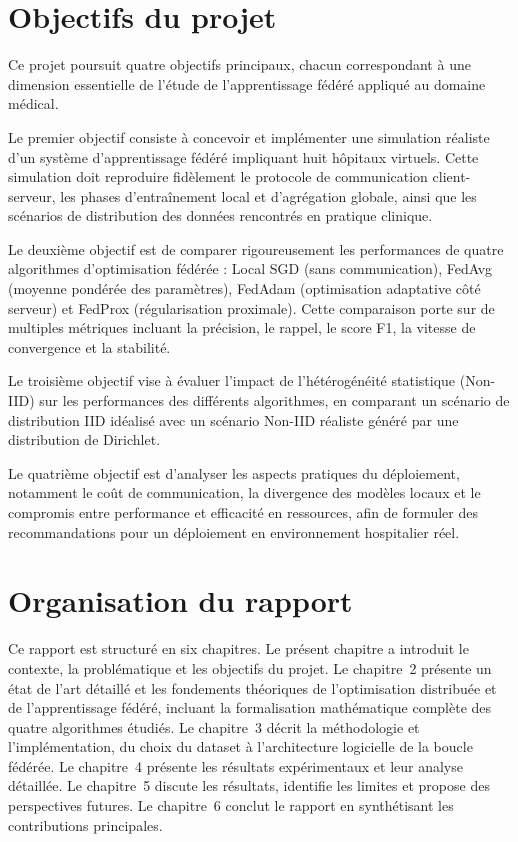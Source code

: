 \documentclass[12pt,a4paper]{report}
\begin{document}
\section{Objectifs du projet}

Ce projet poursuit quatre objectifs principaux, chacun correspondant \`{a} une dimension essentielle de l'\'{e}tude de l'apprentissage f\'{e}d\'{e}r\'{e} appliqu\'{e} au domaine m\'{e}dical.

Le premier objectif consiste \`{a} concevoir et impl\'{e}menter une simulation r\'{e}aliste d'un syst\`{e}me d'apprentissage f\'{e}d\'{e}r\'{e} impliquant huit h\^{o}pitaux virtuels. Cette simulation doit reproduire fid\`{e}lement le protocole de communication client-serveur, les phases d'entra\^{i}nement local et d'agr\'{e}gation globale, ainsi que les sc\'{e}narios de distribution des donn\'{e}es rencontr\'{e}s en pratique clinique.

Le deuxi\`{e}me objectif est de comparer rigoureusement les performances de quatre algorithmes d'optimisation f\'{e}d\'{e}r\'{e}e : Local SGD (sans communication), FedAvg (moyenne pond\'{e}r\'{e}e des param\`{e}tres), FedAdam (optimisation adaptative c\^{o}t\'{e} serveur) et FedProx (r\'{e}gularisation proximale). Cette comparaison porte sur de multiples m\'{e}triques incluant la pr\'{e}cision, le rappel, le score F1, la vitesse de convergence et la stabilit\'{e}.

Le troisi\`{e}me objectif vise \`{a} \'{e}valuer l'impact de l'h\'{e}t\'{e}rog\'{e}n\'{e}it\'{e} statistique (Non-IID) sur les performances des diff\'{e}rents algorithmes, en comparant un sc\'{e}nario de distribution IID id\'{e}alis\'{e} avec un sc\'{e}nario Non-IID r\'{e}aliste g\'{e}n\'{e}r\'{e} par une distribution de Dirichlet.

Le quatri\`{e}me objectif est d'analyser les aspects pratiques du d\'{e}ploiement, notamment le co\^{u}t de communication, la divergence des mod\`{e}les locaux et le compromis entre performance et efficacit\'{e} en ressources, afin de formuler des recommandations pour un d\'{e}ploiement en environnement hospitalier r\'{e}el.

\section{Organisation du rapport}

Ce rapport est structur\'{e} en six chapitres. Le pr\'{e}sent chapitre a introduit le contexte, la probl\'{e}matique et les objectifs du projet. Le chapitre~2 pr\'{e}sente un \'{e}tat de l'art d\'{e}taill\'{e} et les fondements th\'{e}oriques de l'optimisation distribu\'{e}e et de l'apprentissage f\'{e}d\'{e}r\'{e}, incluant la formalisation math\'{e}matique compl\`{e}te des quatre algorithmes \'{e}tudi\'{e}s. Le chapitre~3 d\'{e}crit la m\'{e}thodologie et l'impl\'{e}mentation, du choix du dataset \`{a} l'architecture logicielle de la boucle f\'{e}d\'{e}r\'{e}e. Le chapitre~4 pr\'{e}sente les r\'{e}sultats exp\'{e}rimentaux et leur analyse d\'{e}taill\'{e}e. Le chapitre~5 discute les r\'{e}sultats, identifie les limites et propose des perspectives futures. Le chapitre~6 conclut le rapport en synth\'{e}tisant les contributions principales.
\end{document}
